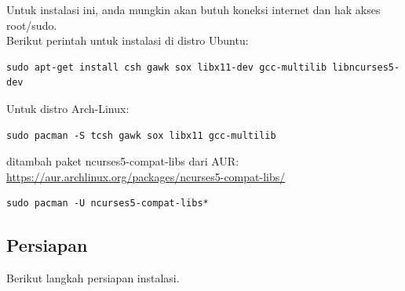 \documentclass[12pt,]{article}
\begin{document}
	Untuk instalasi ini, anda mungkin akan butuh koneksi internet dan hak akses root/sudo. \\

	Berikut perintah untuk instalasi di distro Ubuntu:
	\begin{verbatim}
sudo apt-get install csh gawk sox libx11-dev gcc-multilib libncurses5-dev
	\end{verbatim}

	Untuk distro Arch-Linux:
	\begin{verbatim}
sudo pacman -S tcsh gawk sox libx11 gcc-multilib
	\end{verbatim}

	ditambah paket ncurses5-compat-libs dari AUR:\\
	\url{https://aur.archlinux.org/packages/ncurses5-compat-libs/}

	\begin{verbatim}
sudo pacman -U ncurses5-compat-libs*
	\end{verbatim}

	\newpage
	\subsection{Persiapan}

	Berikut langkah persiapan instalasi.
\end{document}
